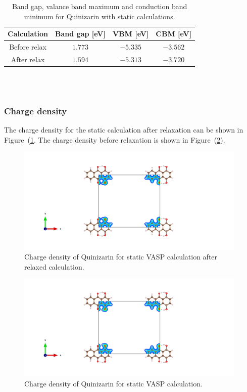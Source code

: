 \documentclass{article}
\begin{document}
      \begin{table}[H]
        \centering
        \caption{Band gap, valance band maximum and conduction band minimum for Quinizarin with static calculations. }
        \vspace{0mm}
        \label{tab:bandgapquinizarin}
        \begin{tabular}{|c|c|c|c|}
            \hline
            Calculation & Band gap [eV] & VBM [eV] & CBM [eV]  \\
            \hline \hline
            Before relax & $1.773$ & $-5.335$ & $-3.562$ \\
            After relax & $1.594$ & $-5.313$ & $-3.720$ \\
            \hline
        \end{tabular} \\
        \hspace{0pt}\\
      \end{table}


    \subsubsection{Charge density}

      The charge density for the static calculation after relaxation can be shown in Figure~(\ref{fig:basic_staticafter_CHGCAR}. The charge density before relaxation is shown in Figure~(\ref{fig:basic_staticbefore_CHGCAR}).

      \begin{figure}[H]
        \centering
        \includegraphics[width = 11cm]{../fig/basic_staticafter_CHGCAR.png}
        \caption{Charge density of Quinizarin for static VASP calculation after relaxed calculation. }
        \label{fig:basic_staticafter_CHGCAR}
      \end{figure}

      \begin{figure}[H]
        \centering
        \includegraphics[width = 11cm]{../fig/basic_staticbefore_CHGCAR.png}
        \caption{Charge density of Quinizarin for static VASP calculation. }
        \label{fig:basic_staticbefore_CHGCAR}
      \end{figure}
\end{document}
